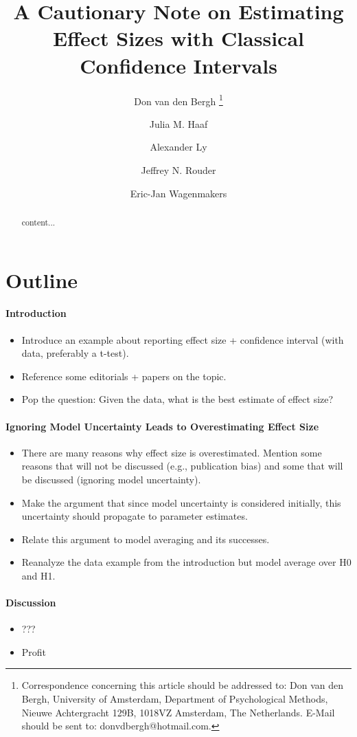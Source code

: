 \documentclass[a4paper]{article}
\title{A Cautionary Note on Estimating Effect Sizes with Classical Confidence Intervals}
\author[1]{Don van den Bergh%
	\thanks{Correspondence concerning this article should be addressed to: Don van den Bergh, University of Amsterdam, Department of Psychological Methods, Nieuwe Achtergracht 129B, 1018VZ Amsterdam, The Netherlands. E-Mail should be sent to: donvdbergh@hotmail.com.
}}
\author[1]{Julia M. Haaf}
\author[1,2]{Alexander Ly}
\author[3]{\authorcr Jeffrey N. Rouder} %
\author[1]{Eric-Jan Wagenmakers}
\affil[1]{University of Amsterdam}
\affil[2]{Centrum Wiskunde \& Informatica}
\affil[3]{University of California Irvine}
\date{}
\begin{document}
\section*{Outline}

\paragraph{Introduction}
\begin{itemize}
	\item Introduce an example about reporting effect size + confidence interval (with data, preferably a t-test). 
	\item Reference some editorials + papers on the topic.
	\item Pop the question: Given the data, what is the best estimate of effect size?
\end{itemize}
\paragraph{Ignoring Model Uncertainty Leads to Overestimating Effect Size}
\begin{itemize}
	\item There are many reasons why effect size is overestimated. Mention some reasons that will not be discussed (e.g., publication bias) and some that will be discussed (ignoring model uncertainty).
	\item Make the argument that since model uncertainty is considered initially, this uncertainty should propagate to parameter estimates.
	\item Relate this argument to model averaging and its successes.
	\item Reanalyze the data example from the introduction but model average over H0 and H1.
\end{itemize}
\paragraph{Discussion}
\begin{itemize}
	\item ???
	\item Profit
\end{itemize}

\newpage
\maketitle

\begin{abstract}
	content...
\end{abstract}
\end{document}
